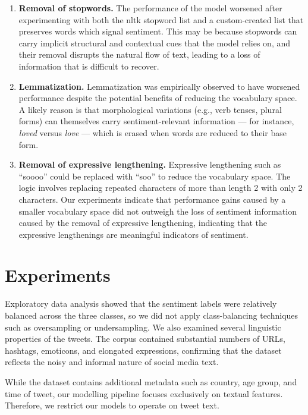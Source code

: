 \documentclass[11pt]{article}
\begin{document}
\begin{enumerate}
    \item \textbf{Removal of stopwords.} The performance of the model worsened after experimenting with both the nltk stopword list and a custom-created list that preserves words which signal sentiment. This may be because stopwords can carry implicit structural and contextual cues that the model relies on, and their removal disrupts the natural flow of text, leading to a loss of information that is difficult to recover.
    \item \textbf{Lemmatization.} Lemmatization was empirically observed to have worsened performance despite the potential benefits of reducing the vocabulary space. A likely reason is that morphological variations (e.g., verb tenses, plural forms) can themselves carry sentiment-relevant information --- for instance, \textit{loved} versus \textit{love} --- which is erased when words are reduced to their base form.
    \item \textbf{Removal of expressive lengthening.} Expressive lengthening such as ``soooo'' could be replaced with ``soo'' to reduce the vocabulary space. The logic involves replacing repeated characters of more than length 2 with only 2 characters. Our experiments indicate that performance gains caused by a smaller vocabulary space did not outweigh the loss of sentiment information caused by the removal of expressive lengthening, indicating that the expressive lengthenings are meaningful indicators of sentiment.
\end{enumerate}


\section{Experiments}

Exploratory data analysis showed that the sentiment labels were relatively balanced across the three classes, so we did not apply class-balancing techniques such as oversampling or undersampling. We also examined several linguistic properties of the tweets. The corpus contained substantial numbers of URLs, hashtags, emoticons, and elongated expressions, confirming that the dataset reflects the noisy and informal nature of social media text.

While the dataset contains additional metadata such as country, age group, and time of tweet, our modelling pipeline focuses exclusively on textual features. Therefore, we restrict our models to operate on tweet text.
\end{document}
